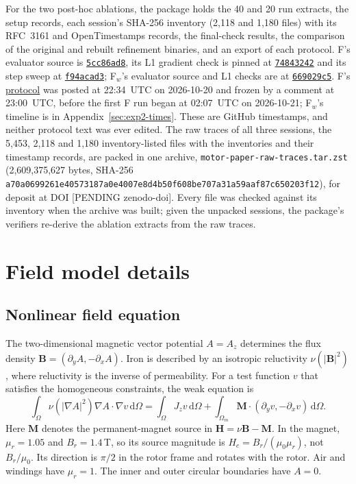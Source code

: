 \documentclass{anvil-paper}
\newcommand{\dd}{\,\mathrm{d}}
\begin{document}
For the two post-hoc ablations, the package holds the 40 and 20 run
extracts, the setup records, each session's SHA-256 inventory (2,118 and
1,180 files) with its RFC~3161 and OpenTimestamps records, the final-check
results, the comparison of the original and rebuilt refinement binaries,
and an export of each protocol. F's evaluator source is
\href{https://github.com/rjwalters/geode-fem/tree/5cc86ad81aeea4847a2608fcafde22a1bbfb6990/benchmarks/motor_optimization}{\texttt{5cc86ad8}},
its L1 gradient check is pinned at
\href{https://github.com/rjwalters/geode-fem/tree/74843242db03e8d57edf971420171064bf19f107/benchmarks/motor_optimization/harness}{\texttt{74843242}}
and its step sweep at
\href{https://github.com/rjwalters/geode-fem/tree/f94acad3f312c7d417830ff82b66a78a1ea89fb2/benchmarks/motor_optimization/harness}{\texttt{f94acad3}};
F$_w$'s evaluator source and L1 checks are at
\href{https://github.com/rjwalters/geode-fem/tree/669029c5653cb5fe4724ec0c7525ba60c770975e/benchmarks/motor_optimization}{\texttt{669029c5}}.
F's \href{https://github.com/rjwalters/geode-fem/issues/1218}{protocol}
was posted at 22:34~UTC on 2026-10-20 and frozen by a comment at
23:00~UTC, before the first F run began at 02:07~UTC on 2026-10-21;
F$_w$'s timeline is in Appendix~\ref{sec:exp2-times}. These are GitHub
timestamps, and neither protocol text was ever edited. The raw traces of all
three sessions, the 5,453, 2,118 and 1,180 inventory-listed files with the
inventories and their timestamp records, are packed in one archive,
\texttt{motor-paper-raw-traces.tar.zst} (2,609,375,627 bytes, SHA-256
\texttt{a70a0699261e40573187a0e4007e8d4b}\allowbreak\texttt{50f608be707a31a59aaf87c650203f12}), for deposit at
DOI [PENDING zenodo-doi]. Every file was checked against its inventory
when the archive was built; given the unpacked sessions, the package's
verifiers re-derive the ablation extracts from the raw traces.

\appendix
\section{Field model details}\label{sec:fieldmodel}
\subsection{Nonlinear field equation}
The two-dimensional magnetic vector potential $A=A_z$ determines the
flux density $\mathbf B=(\partial_y A,-\partial_x A)$. Iron is described
by an isotropic reluctivity $\nu(|\mathbf B|^2)$, where reluctivity is
the inverse of permeability. For a test function $v$ that satisfies the
homogeneous constraints, the weak equation is
\begin{equation}
 \int_\Omega \nu(|\nabla A|^2)\nabla A\cdot\nabla v\dd\Omega
 =\int_\Omega J_z v\dd\Omega
  +\int_{\Omega_m}\mathbf M\cdot(\partial_y v,-\partial_x v)\dd\Omega.
 \label{eq:weak}
\end{equation}
Here $\mathbf M$ denotes the permanent-magnet source in
$\mathbf H=\nu\mathbf B-\mathbf M$. In the magnet,
$\mu_r=1.05$ and $B_r=1.4$\,T, so its source magnitude is
$H_c=B_r/(\mu_0\mu_r)$, not $B_r/\mu_0$. Its direction is $\pi/2$
in the rotor frame and rotates with the rotor. Air and windings have
$\mu_r=1$. The inner and outer circular boundaries have $A=0$.
\end{document}
